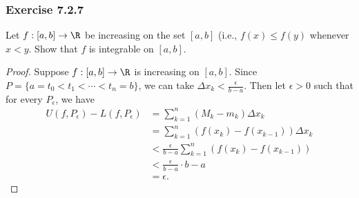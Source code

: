 \subsubsection{Exercise 7.2.7}  Let \( f: [a,b] \to \R   \) be increasing on the set \( [a,b]  \) (i.e., \( f(x) \leq f(y) \) whenever \( x < y  \). Show that \( f  \) is integrable on \( [a,b]  \).
\begin{proof}
	Suppose \( f: [a,b] \to \R    \) is increasing on \( [a,b]  \). Since \( P = \{ a = t_{0} < t_{1} < \dotsb < t_{n} = b   \}  \), we can take \( \Delta x_{k } < \frac{ \epsilon  }{ b -a  }  \). Then let \( \epsilon > 0 \) such that for every \( P_{\epsilon } \), we have 
	\begin{align*}
	    U(f, P_{\epsilon }) - L(f, P_{\epsilon }) &= \sum_{ k=1 }^{ n } (M_{k } - m_{k }) \Delta x_{k } \\
												  &= \sum_{ k=1 }^{ n } (f(x_{k}) - f(x_{k-1})) \Delta x_{k } \\
												  &< \frac{ \epsilon  }{ b -a  } \sum_{ k=1 }^{ n } (f(x_{k }) - f(x_{k-1})) \\
												  &< \frac{ \epsilon  }{ b - a } \cdot b -a \\
												  &= \epsilon.
	\end{align*}
\end{proof}





